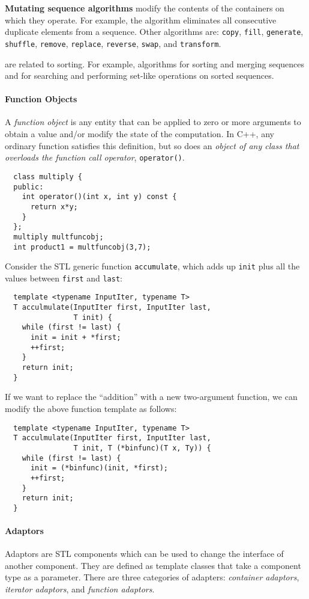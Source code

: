 \documentclass{memo}
\begin{document}
{\bf Mutating sequence algorithms} modify the contents of the containers on
which they operate. For example, the  algorithm eliminates all
consecutive duplicate elements from a sequence. Other algorithms are:
\verb+copy+, \verb+fill+, \verb+generate+, \verb+shuffle+, \verb+remove+,
\verb+replace+, \verb+reverse+, \verb+swap+, and \verb+transform+. 

 are related to sorting. For example,
algorithms for sorting and merging sequences and for searching and performing
set-like operations on sorted sequences. 

\paragraph{Function Objects}
A {\em function object} is any entity  that can be applied to zero or more
arguments to obtain a value and/or modify the state of the computation. 
In C++, any ordinary function satisfies this definition, but so does an {\em
  object of any class that overloads the function call operator\/},
\verb+operator()+. 

\begin{verbatim}
  class multiply {
  public:
    int operator()(int x, int y) const {
      return x*y; 
    }
  };
  multiply multfuncobj;
  int product1 = multfuncobj(3,7);
\end{verbatim}


Consider the STL generic function \verb+accumulate+, which adds up \verb+init+
plus all the values between \verb+first+ and \verb+last+:
\begin{verbatim}
  template <typename InputIter, typename T>
  T acculmulate(InputIter first, InputIter last, 
                T init) {
    while (first != last) { 
      init = init + *first;
      ++first;
    }
    return init;
  }
\end{verbatim}

If we want to replace the ``addition'' with a new two-argument function, we
can modify the above function template as follows:

\begin{verbatim}
  template <typename InputIter, typename T>
  T acculmulate(InputIter first, InputIter last, 
                T init, T (*binfunc)(T x, Ty)) {
    while (first != last) { 
      init = (*binfunc)(init, *first);
      ++first;
    }
    return init;
  }
\end{verbatim}

\paragraph{Adaptors}
Adaptors are STL components which can be used to change the interface of
another component. They are defined as template classes that take a component
type as a parameter. There are three categories of adapters: {\em container
  adaptors\/}, {\em iterator adaptors\/}, and {\em function adaptors\/}. 
\end{document}
